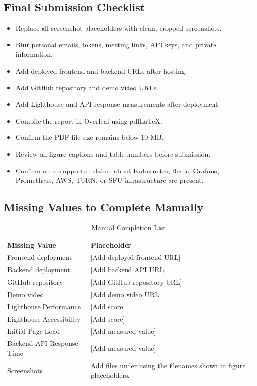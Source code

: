 \documentclass[11pt,a4paper]{article}
\begin{document}
\subsection{Final Submission Checklist}
\begin{itemize}
  \item Replace all screenshot placeholders with clean, cropped screenshots.
  \item Blur personal emails, tokens, meeting links, API keys, and private information.
  \item Add deployed frontend and backend URLs after hosting.
  \item Add GitHub repository and demo video URLs.
  \item Add Lighthouse and API response measurements after deployment.
  \item Compile the report in Overleaf using pdfLaTeX.
  \item Confirm the PDF file size remains below 10 MB.
  \item Review all figure captions and table numbers before submission.
  \item Confirm no unsupported claims about Kubernetes, Redis, Grafana, Prometheus, AWS, TURN, or SFU infrastructure are present.
\end{itemize}

\subsection{Missing Values to Complete Manually}
\begin{table}[H]
\centering
\small
{}
\begin{tabularx}{\linewidth}{L{4.2cm} Y}
\toprule
\textbf{Missing Value} & \textbf{Placeholder}\\
\midrule
Frontend deployment & [Add deployed frontend URL]\\
Backend deployment & [Add backend API URL]\\
GitHub repository & [Add GitHub repository URL]\\
Demo video & [Add demo video URL]\\
Lighthouse Performance & [Add score]\\
Lighthouse Accessibility & [Add score]\\
Initial Page Load & [Add measured value]\\
Backend API Response Time & [Add measured value]\\
Screenshots & Add files under  using the filenames shown in figure placeholders.\\
\bottomrule
\end{tabularx}
\caption{Manual Completion List}
\label{tab:missing}
\end{table}
\end{document}
